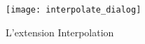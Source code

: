 \begin{figure}[ht]
   \begin{center}
   \texttt{[image: interpolate\_dialog]}
   \caption{L'extension Interpolation \nixcaption}\label{fig:interpolation_dialog}
\end{center}  
\end{figure}

\label{interpolation_usage}

